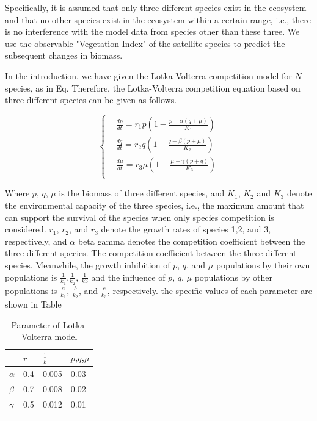 \documentclass[12pt]{article}
\begin{document}
Specifically, it is assumed that only three different species exist in the ecosystem and that no other species exist in the ecosystem within a certain range, i.e., there is no interference with the model data from species other than these three. We use the observable "Vegetation Index" of the satellite species to predict the subsequent changes in biomass.

In the introduction, we have given the Lotka-Volterra competition model for $N$ species, as in Eq. Therefore, the Lotka-Volterra competition equation based on three different species can be given as follows.

\begin{equation}
	\left \{
	\begin{aligned}
		 & \frac{dp}{dt} = r_1p (1- \frac{p - \alpha (q + \mu)}{K_1})     \\
		 & \frac{dq}{dt} = r_2q (1- \frac{q - \beta (p + \mu)}{K_2})      \\
		 & \frac{d\mu}{dt} = r_3\mu (1- \frac{\mu - \gamma (p + q)}{K_3}) \\
	\end{aligned}
	\right .
\end{equation}

Where $p$, $q$, $\mu$ is the biomass of three different species, and $K_1$, $K_2$ and $K_3$ denote the environmental capacity of the three species, i.e., the maximum amount that can support the survival of the species when only species competition is considered. $r_1$, $r_2$, and $r_3$ denote the growth rates of species 1,2, and 3, respectively, and $\alpha$ beta gamma denotes the competition coefficient between the three different species. The competition coefficient between the three different species. Meanwhile, the growth inhibition of $p$, $q$, and $\mu$ populations by their own populations is $\frac{1}{k_1}$,$\frac{1}{k_2}$, $\frac{1}{k3}$ and the influence of $p$, $q$, $\mu$ populations by other populations is $\frac{a}{k_1}$, $\frac{b}{k_2}$, and $\frac{c}{k_3}$, respectively. the specific values of each parameter are shown in Table


\begin{table}[htb]
	\caption{Parameter of Lotka-Volterra model}
	\centering
	\begin{tabular}{@{}llll@{}}
		\toprule
		         & $r$ & $\frac{1}{k}$ & $p$,$q$,$\mu$ \\
		\midrule
		$\alpha$ & 0.4 & 0.005         & 0.03          \\
		$\beta$  & 0.7 & 0.008         & 0.02          \\
		$\gamma$ & 0.5 & 0.012         & 0.01          \\
		\bottomrule                                    \\
	\end{tabular}
	\label{tab:lv_parameter}
\end{table}
\end{document}
